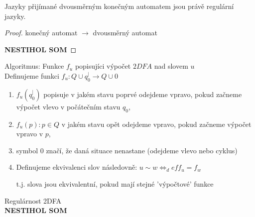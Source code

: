 \documentclass[../main.tex]{subfiles}
\begin{document}
\begin{theorem}
    Jazyky přijímané dvousměrným konečným automatem jsou právě regulární jazyky. 
\end{theorem}
\begin{proof}
    konečný automat $\rightarrow$ dvousměrný automat
    
    \textbf{NESTIHOL SOM}
\end{proof}

\begin{theorem}
    Algoritmus: Funkce $f_u$ popisujíci výpočet $2DFA$ nad slovem $u$\\

    Definujeme funkci $f_u : Q \cup {q^|_0} \rightarrow Q\cup {0}$
    \begin{enumerate}
        \item $f_u(q^|_0)$ popisuje v jakém stavu poprvé odejdeme vpravo, pokud začneme výpočet vlevo v počátečním stavu $q_0$,
        \item $f_u(p): p \in Q$ v jakém stavu opět odejdeme vpravo, pokud začneme výpočet vpravo v $p$,
        \item symbol $0$ značí, že daná situace nenastane (odejdeme vlevo nebo cyklus)
        \item Definujeme ekvivalenci slov následovně: $u \sim w \Leftrightarrow_def f_u = f_w$
        \begin{remark}
            t.j. slova jsou ekvivalentní, pokud mají stejné 'výpočtové' funkce
        \end{remark}
    \end{enumerate}

    Regulárnost 2DFA\\

    \textbf{NESTIHOL SOM} 
\end{theorem}
\end{document}
